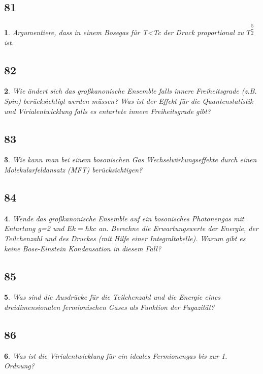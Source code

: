 \documentclass[12pt,a4paper]{report}
\newtheorem{myfrag}{}%
\begin{document}
\subsection{81}
\begin{myfrag}
Argumentiere, dass in einem Bosegas für T<Tc der Druck proportional zu $T^{\dfrac{5}{2}}$
ist.
\end{myfrag}
\subsection{82}
\begin{myfrag}
Wie ändert sich das großkanonische Ensemble falls innere Freiheitsgrade
(z.B. Spin) berücksichtigt werden müssen? Was ist der Effekt für die
Quantenstatistik und Virialentwicklung falls es entartete innere Freiheitsgrade
gibt?
\end{myfrag}
\subsection{83}
\begin{myfrag}
Wie kann man bei einem bosonischen Gas Wechselwirkungseffekte durch
einen Molekularfeldansatz (MFT) berücksichtigen?
\end{myfrag}
\subsection{84}
\begin{myfrag}
Wende das großkanonische Ensemble auf ein bosonisches Photonengas mit
Entartung g=2 und $Ek=\hbar kc$ an. Berechne die Erwartungswerte der Energie,
der Teilchenzahl und des Druckes (mit Hilfe einer Integraltabelle). Warum
gibt es keine Bose-Einstein Kondensation in diesem Fall?
\end{myfrag}
\subsection{85}
\begin{myfrag}
Was sind die Ausdrücke für die Teilchenzahl und die Energie eines
dreidimensionalen fermionischen Gases als Funktion der Fugazität?
\end{myfrag}
\subsection{86}
\begin{myfrag}
Was ist die Virialentwicklung für ein ideales Fermionengas bis zur 1.
Ordnung?
\end{myfrag}
\end{document}
